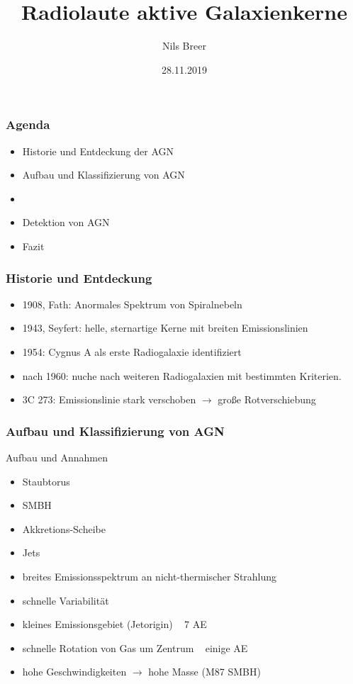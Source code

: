 \documentclass[aspectratio=1610, 9pt]{beamer}
\title{Radiolaute aktive Galaxienkerne}
\author[N.Breer]{Nils Breer}
\institute{Fakultät Physik}
\date{28.11.2019}
\begin{document}
\maketitle

\begin{frame}\frametitle{Agenda}
  \begin{itemize}
    \item Historie und Entdeckung der AGN
    \item Aufbau und Klassifizierung von AGN
    \item 
    \item Detektion von AGN
    \item Fazit
  \end{itemize}
\end{frame}

\begin{frame}\frametitle{Historie und Entdeckung}
  \begin{itemize}
    \item 1908, Fath: Anormales Spektrum von Spiralnebeln
    \item 1943, Seyfert: helle, sternartige Kerne mit breiten Emissionslinien
    \item 1954: Cygnus A als erste Radiogalaxie identifiziert
    \item nach 1960: nuche nach weiteren Radiogalaxien mit bestimmten Kriterien.
    \item 3C 273: Emissionslinie stark verschoben $\to$ gro\ss e Rotverschiebung
  \end{itemize}
\end{frame}


\begin{frame}\frametitle{Aufbau und Klassifizierung von AGN}
  \begin{block}{Aufbau und Annahmen}
  \begin{itemize}
    \item Staubtorus
    \item SMBH
    \item Akkretions-Scheibe
    \item Jets
    \item breites Emissionsspektrum an nicht-thermischer Strahlung
    \item schnelle Variabilit\"at
    \item kleines Emissionsgebiet (Jetorigin) ~ 7 AE
    \item schnelle Rotation von Gas um Zentrum ~ einige AE
    \item hohe Geschwindigkeiten $\to$ hohe Masse (M87 SMBH)
  \end{itemize}
  \end{block}
\end{frame}
\end{document}
